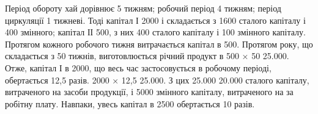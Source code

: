 Період обороту хай дорівнює 5 тижням; робочий період \deq{} 4 тижням;
період циркуляції \deq{} 1 тижневі. Тоді капітал І \deq{} 2000 і складається
з 1600 сталого капіталу і 400 змінного; капітал
ІІ \deq{} 500, з них 400 сталого капіталу і 100 змінного капіталу. Протягом кожного робочого тижня витрачається
капітал в 500. Протягом року, що складається з 50 тижнів,
виготовлюється річний продукт в 500 × 50 \deq{} \num{25.000}. Отже, капітал
І в 2000, що весь час застосовується в робочому періоді,
обертається 12,5 разів. 2000 × 12,5 \deq{} \num{25.000}. З цих \num{25.000}  \deq{} \num{20.000} сталого капіталу, витраченого на засоби
продукції, і  \deq{} 5000 змінного капіталу, витраченого на за
робітну плату. Навпаки, увесь капітал в 2500 обертається
 \deq{} 10 разів.

